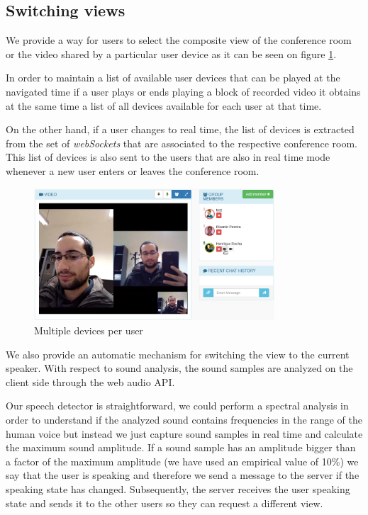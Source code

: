	\subsection{Switching views}

		We provide a way for users to select the composite view of the conference room or the video shared by a particular user device as it can be seen on figure \ref{fig:devices}. 

		In order to maintain a list of available user devices that can be played at the navigated time if a user plays or ends playing a block of recorded video it obtains at the same time a list of all devices available for each user at that time.

		On the other hand, if a user changes to real time, the list of devices is extracted from the set of \emph{webSockets} that are associated to the respective conference room. This list of devices is also sent to the users that are also in real time mode whenever a new user enters or leaves the conference room.

	\begin{figure}[!htb]
		\centering
		\includegraphics[width=0.8\textwidth]{figures/devices.png}
		\caption{Multiple devices per user}
		\label{fig:devices}
	\end{figure}

		We also provide an automatic mechanism for switching the view to the current speaker. With respect to sound analysis, the sound samples are analyzed on the client side through the web audio \ac{API}.

		Our speech detector is straightforward, we could perform a spectral analysis in order to understand if the analyzed sound contains frequencies in the range of the human voice but instead we just capture sound samples in real time and calculate the maximum sound amplitude. If a sound sample has an amplitude bigger than a factor of the maximum amplitude (we have used an empirical value of 10\%) we say that the user is speaking and therefore we send a message to the server if the speaking state has changed. Subsequently, the server receives the user speaking state and sends it to the other users so they can request a different view.


